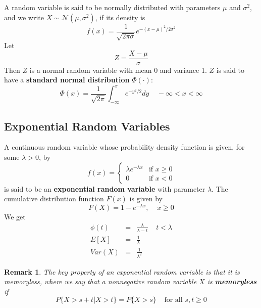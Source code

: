\documentclass[12pt]{article}
\newtheorem{remark}[theorem]{Remark}
\begin{document}
A random variable is said to be normally distributed with parameters $\mu$ and $\sigma^2$, and we write $X \sim \mathcal{N}(\mu, \sigma^2)$, if its density is
\begin{equation*}
  f(x) = \frac{1}{\sqrt{2 \pi \sigma}} e^{-(x-\mu)^2/2\sigma^2}
\end{equation*}
Let
\begin{equation*}
  Z = \frac{X-\mu}{\sigma}
\end{equation*}
Then $Z$ is a normal random variable with mean 0 and variance 1. $Z$ is said to have a \textbf{standard normal distribution} $\Phi(\cdot)$:
\begin{equation*}
  \Phi(x) = \frac{1}{\sqrt{2 \pi}} \int_{-\infty}^x e^{-y^2/2} dy
  \;\;\;\; -\infty < x < \infty
\end{equation*}

\subsection{Exponential Random Variables}

A continuous random variable whose probability density function is given, for some $\lambda > 0$, by
\begin{equation*}
  f(x) =
  \begin{cases}
    \lambda e^{-\lambda x} & \text{if } x \ge 0 \\
    0 & \text{if } x < 0
  \end{cases}
\end{equation*}
is said to be an \textbf{exponential random variable} with parameter $\lambda$. The cumulative distribution function $F(x)$ is given by
\begin{equation*}
  F(X) = 1 - e^{-\lambda x}, \;\;\;\; x \ge 0
\end{equation*}
We get
\begin{eqnarray*}
  \phi(t) &=& \frac{\lambda}{\lambda - t} \;\;\;\; t < \lambda \\
  E[X] &=& \frac{1}{\lambda} \\
  Var(X) &=& \frac{1}{\lambda^2}
\end{eqnarray*}

\begin{remark}
  The key property of an exponential random variable is that it is memoryless, where we say that a nonnegative random variable $X$ is \textbf{memoryless} if
  \begin{equation*}
    P\{ X > s+t | X>t \} = P\{ X >s \} \;\;\;\; \text{for all } s,t \ge 0
  \end{equation*}
\end{remark}
\end{document}
